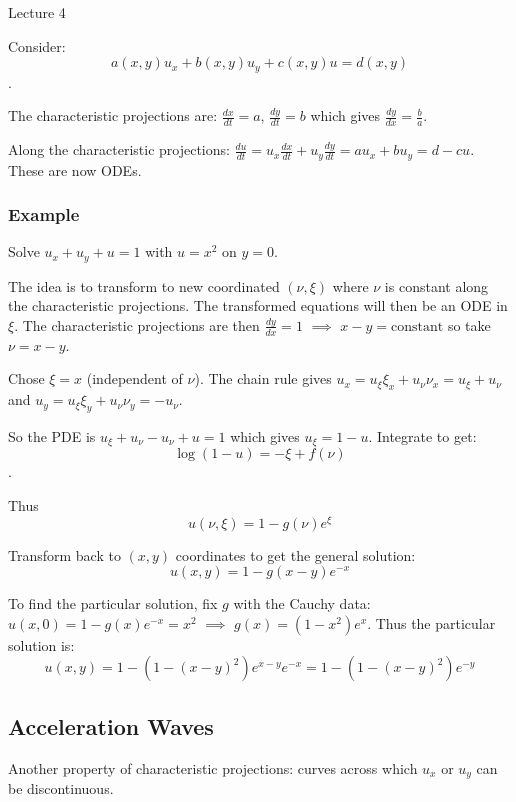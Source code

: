 \begin{center}

Lecture 4

\end{center}

Consider: $$a(x,y) u_x + b(x,y) u_y + c(x,y) u = d(x,y)$$.

The characteristic projections are: $\frac{dx}{dt} = a$, $\frac{dy}{dt} = b$ which gives $\frac{dy}{dx} = \frac{b}{a}$.

Along the characteristic projections: $\frac{du}{dt} = u_x \frac{dx}{dt} + u_y \frac{dy}{dt} = a u_x + b u_y = d - cu$. These are now ODEs.

\subsubsection*{Example}

Solve $u_x + u_y + u = 1$ with $u=x^2$ on $y=0$.

\vspace{\baselineskip}

The idea is to transform to new coordinated $(\nu, \xi)$ where $\nu$ is constant along the characteristic projections. The transformed equations will then be an ODE in $\xi$. The characteristic projections are then $\frac{dy}{dx} = 1$ $\implies$ $x-y = \text{constant}$ so take $\nu = x-y$.

Chose $\xi = x$ (independent of $\nu$). The chain rule gives $u_x = u_{\xi} \xi_x + u_{\nu} \nu_x = u_{\xi} + u_{\nu}$ and $u_y = u_{\xi} \xi_y + u_{\nu} \nu_y = - u_{\nu}$.

So the PDE is $u_{\xi} + u_{\nu} - u_{\nu} + u = 1$ which gives $u_{\xi} = 1 - u$. Integrate to get: $$\log (1-u) = -\xi + f(\nu)$$.

Thus $$u(\nu, \xi) = 1 - g(\nu) e^{\xi}$$

Transform back to $(x,y)$ coordinates to get the general solution: $$u(x,y) = 1 - g(x-y) e^{-x}$$

To find the particular solution, fix $g$ with the Cauchy data: $u(x,0) = 1 - g(x) e^{-x} = x^2$ $\implies$ $g(x) = (1-x^2)e^x$. Thus the particular solution is: $$u(x,y) = 1 - (1-(x-y)^2) e^{x-y} e^{-x} = 1 - (1-(x-y)^2) e^{-y}$$

\subsection{Acceleration Waves}

Another property of characteristic projections: curves across which $u_x$ or $u_y$ can be discontinuous. 

